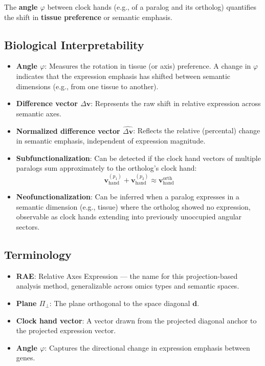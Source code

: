 \documentclass[11pt,a4paper]{article}
\begin{document}
The \textbf{angle $\varphi$} between clock hands (e.g., of a paralog and its ortholog) quantifies the shift in \textbf{tissue preference} or semantic emphasis.

\subsection{Biological Interpretability}

\begin{itemize}
  \item \textbf{Angle $\varphi$}: Measures the rotation in tissue (or axis) preference. A change in $\varphi$ indicates that the expression emphasis has shifted between semantic dimensions (e.g., from one tissue to another).
  
  \item \textbf{Difference vector $\Delta \mathbf{v}$}: Represents the raw shift in relative expression across semantic axes.

  \item \textbf{Normalized difference vector $\hat{\Delta \mathbf{v}}$}: Reflects the relative (percental) change in semantic emphasis, independent of expression magnitude.

  \item \textbf{Subfunctionalization}: Can be detected if the clock hand vectors of multiple paralogs sum approximately to the ortholog’s clock hand:
  \[
  \mathbf{v}_{\text{hand}}^{(p_1)} + \mathbf{v}_{\text{hand}}^{(p_2)} \approx \mathbf{v}_{\text{hand}}^{\text{orth}}
  \]

  \item \textbf{Neofunctionalization}: Can be inferred when a paralog expresses in a semantic dimension (e.g., tissue) where the ortholog showed no expression, observable as clock hands extending into previously unoccupied angular sectors.
\end{itemize}

\subsection{Terminology}

\begin{itemize}
  \item \textbf{RAE}: Relative Axes Expression — the name for this projection-based analysis method, generalizable across omics types and semantic spaces.
  \item \textbf{Plane $\Pi_{\perp}$}: The plane orthogonal to the space diagonal $\mathbf{d}$.
  \item \textbf{Clock hand vector}: A vector drawn from the projected diagonal anchor to the projected expression vector.
  \item \textbf{Angle $\varphi$}: Captures the directional change in expression emphasis between genes.
\end{itemize}
\end{document}
